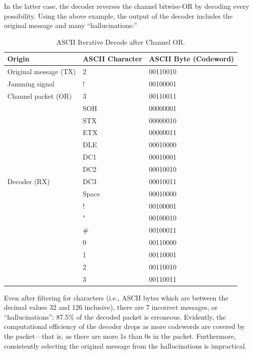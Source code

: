 \documentclass[conference]{IEEEtran}
\begin{document}
In the latter case, the decoder reverses the channel bitwise-OR by decoding every possibility. Using the above example, the output of the decoder includes the original message and many “hallucinations:”   

\begin{table}[h]
    \centering
    \caption{ASCII Iterative Decode after Channel OR. }
    \begin{center}
    \begin{tabular}{ | m{9.5em} | m{1.4cm}| m{1.35cm} | } 
      \hline
      Origin & ASCII Character & ASCII Byte (Codeword) \\ 
      \hline
      Original message (TX) & 2 &  00110010\\ 
      \hline
      Jamming signal & ! &  00100001\\ 
      \hline
      Channel packet (OR) & 3 & 00110011 \\ 
      \hline
                & SOH & 00000001\\
                & STX & 00000010\\
                & ETX & 00000011\\
                & DLE & 00010000\\
                & DC1 & 00010001\\
                & DC2 & 00010010\\
      Decoder (RX) & DC3 & 00010011\\
                & Space & 00010000\\
                & !   & 00100001\\
                & "   & 00100010\\
                & \#   & 00100011\\
                & 0   & 00110000\\
                & 1   & 00110001\\
                & 2   & 00110010\\
                & 3   & 00110011 \\ 
      \hline
    \end{tabular}
    \end{center}
\end{table}

Even after filtering for characters (i.e., ASCII bytes which are between the decimal values 32 and 126 inclusive), there are 7 incorrect messages, or “hallucinations”; 87.5\% of the decoded packet is erroneous. Evidently, the computational efficiency of the decoder drops as more codewords are covered by the packet—that is, as there are more 1s than 0s in the packet. Furthermore, consistently selecting the original message from the hallucinations is impractical.   
\end{document}
